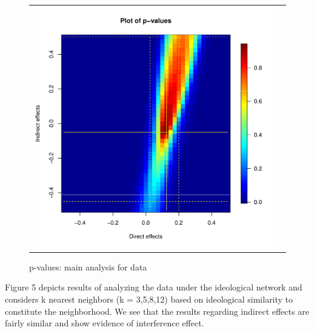 \documentclass[12pt]{article}
\begin{document}
\begin{figure}
	\centering
	\begin{tabular}{cc}
	\includegraphics[scale=0.45]{./images/pval_plot_bergan_main_raw.pdf}
	\end{tabular}
	\caption{p-values: main analysis for \citet{bergan2015call} data}
\end{figure}


Figure 5 depicts results of analyzing the \citet{bergan2015call} data under the ideological network and considers k nearest neighbors (k = 3,5,8,12) based on ideological similarity to constitute the neighborhood. We see that the results regarding indirect effects are fairly similar and show evidence of interference effect.
\end{document}
